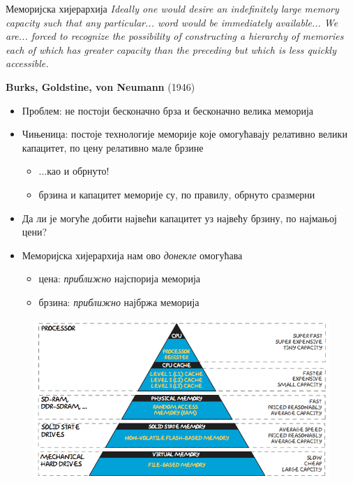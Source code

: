\documentclass[xcolor=table]{beamer}
\begin{document}
    \begin{frame}[allowframebreaks]{Меморијска хијерархија}
        \textit{
            Ideally one would desire an indefinitely large
            memory capacity such that any particular... word
            would be immediately available... We are... forced
            to recognize the possibility of constructing a
            hierarchy of memories each of which has greater
            capacity than the preceding but which is less
            quickly accessible.
        }

        \begin{flushright}
            \textbf{Burks, Goldstine, von Neumann} (1946)
        \end{flushright} 

        \framebreak
        
        \begin{itemize}
            \item Проблем: не постоји бесконачно брза и бесконачно велика меморија
            \item Чињеница: постоје технологије меморије које омогућавају релативно велики капацитет, по цену релативно мале брзине
            \begin{itemize}
                \item ...као и обрнуто!
                \item брзина и капацитет меморије су, по правилу, обрнуто сразмерни
            \end{itemize}
            \item Да ли је могуће добити највећи капацитет уз највећу брзину, по најмањој цени?
            \item Меморијска хијерархија нам ово \textit{донекле} омогућава
            \begin{itemize}
                \item цена: \textit{приближно} најспорија меморија
                \item брзина: \textit{приближно} најбржа меморија
            \end{itemize}
        \end{itemize}
        
        \framebreak

        \begin{figure}
            \centering
            \includegraphics[width=\textwidth,height=0.7\textheight,keepaspectratio]{images/mem1.jpg}
            \label{fig:mem1}
        \end{figure}
    \end{frame}
\end{document}
